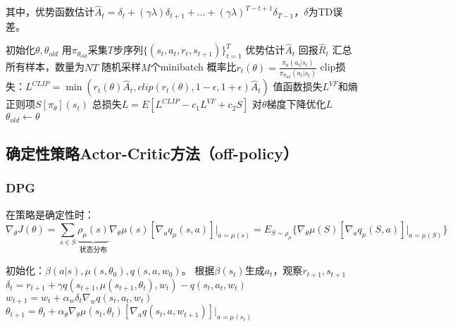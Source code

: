 \documentclass[
12pt, %
a4paper, 
oneside, %
headinclude,footinclude, %
]{scrartcl}
\begin{document}
其中，优势函数估计$ \hat{A}_t = \delta_t + (\gamma\lambda)\delta_{t + 1} + \dots + (\gamma\lambda)^{T - t + 1}\delta_{T - 1} $，$ \delta $为TD误差。
\begin{myalgorithm}[PPO]
\State 初始化$ \theta, \theta_{old} $
\State 用$ \pi_{\theta_{old}} $采集$ T $步序列$ \{(s_t, a_t, r_t, s_{t + 1})\}_{t = 1}^T $
\State 优势估计$ \hat{A}_t $
\State 回报$ \hat{R}_t $
\EndFor
\State 汇总所有样本，数量为$ NT $
\State 随机采样$ M $个minibatch
\State 概率比$ r_t(\theta) = \frac{\pi_\theta(a_t|s_t)}{\pi_{\theta_{old}}(a_t|s_t)} $
\State clip损失：$ L^{CLIP} = \min(r_t(\theta)\hat{A}_t, clip(r_t(\theta), 1 - \epsilon, 1 + \epsilon)\hat{A}_t) $
\State 值函数损失$ L^{VF} $和熵正则项$ S[\pi_\theta](s_t) $
\State 总损失$ L = E[L^{CLIP} - c_1 L^{VF} + c_2 S] $
\State 对$ \theta $梯度下降优化$ L $
\EndFor
\State $ \theta_{old} \gets \theta $
\EndFor
\end{myalgorithm}
\subsection[确定性策略Actor-Critic方法]{确定性策略Actor-Critic方法（off-policy）}
\subsubsection[DPG]{DPG}
在策略是确定性时：
$$ \nabla_\theta J(\theta) = \sum_{s \in S} \underbrace{\rho_\mu(s)}_{\text{状态分布}} \nabla_\theta \mu(s)[\nabla_a q_\mu(s, a)]\bigg|_{a = \mu(s)} = E_{S \sim \rho_\mu}\{\nabla_\theta \mu(S)[\nabla_a q_\mu(S, a)]\bigg|_{a = \mu(S)}\} $$
\begin{myalgorithm}[DPG]
\State 初始化：$ \beta(a|s), \mu(s, \theta_0), q(s, a, w_0) $。
\State 根据$ \beta(s_t) $生成$ a_t $，观察$ r_{t + 1}, s_{t + 1} $
\State $ \delta_t = r_{t + 1} + \gamma q(s_{t + 1}, \mu(s_{t + 1}, \theta_t), w_t) - q(s_t, a_t, w_t) $ 
\State $ w_{t + 1} = w_t + \alpha_w \delta_t \nabla_w q(s_t, a_t, w_t) $ 
\State $ \theta_{t + 1} = \theta_t + \alpha_\theta \nabla_\theta \mu(s_t, \theta_t)[\nabla_a q(s_t, a, w_{t + 1})]|_{a = \mu(s_t)} $ 
\EndFor
\EndFor
\end{myalgorithm}
\end{document}
